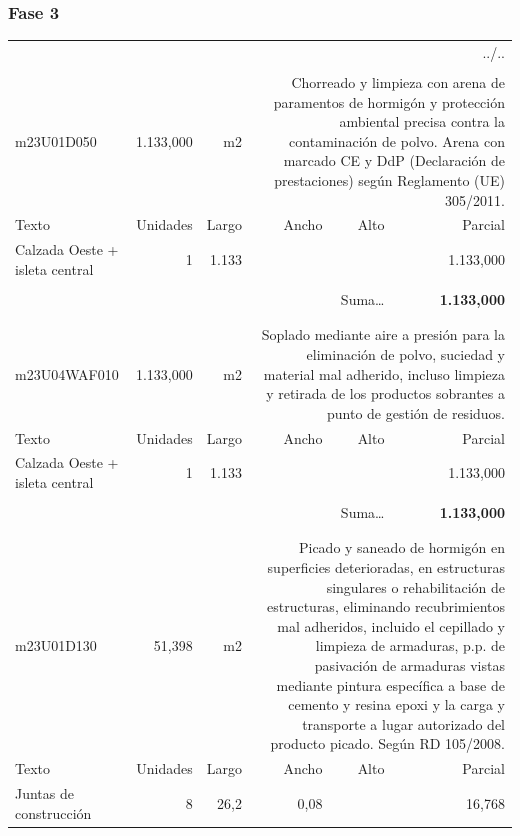 \documentclass{book}%
\begin{document}
\subsubsection{Fase 3}%
\begin{longtable}{lrrrrr}%
\multicolumn{6}{r}{../..}\\%
\endfoot%
\endlastfoot%
&&&&&\\%
m23U01D050& 1.133,000& m2&\multicolumn{3}{p{6cm}}{\scriptsize Chorreado y limpieza con arena de paramentos de hormigón y protección ambiental precisa contra la contaminación de polvo. Arena con marcado CE y DdP (Declaración de prestaciones) según Reglamento (UE) 305/2011.\normalsize}\\%
Texto&Unidades&Largo&Ancho&Alto&Parcial\\%
\hline%
\multicolumn{1}{p{3.5cm}}{Calzada Oeste + isleta central}&1&1.133&&& 1.133,000\\%
&&&&&\\%
\multicolumn{5}{r}{Suma\ldots}&\textbf{ 1.133,000}\\%
\hline%
&&&&&\\%
&&&&&\\%
m23U04WAF010& 1.133,000& m2&\multicolumn{3}{p{6cm}}{\scriptsize Soplado mediante aire a presión para la eliminación de polvo, suciedad y material mal adherido, incluso limpieza y retirada de los productos sobrantes a punto de gestión de residuos.\normalsize}\\%
Texto&Unidades&Largo&Ancho&Alto&Parcial\\%
\hline%
\multicolumn{1}{p{3.5cm}}{Calzada Oeste + isleta central}&1&1.133&&& 1.133,000\\%
&&&&&\\%
\multicolumn{5}{r}{Suma\ldots}&\textbf{ 1.133,000}\\%
\hline%
&&&&&\\%
&&&&&\\%
m23U01D130&    51,398& m2&\multicolumn{3}{p{6cm}}{\scriptsize Picado y saneado de hormigón en superficies deterioradas, en estructuras singulares o rehabilitación de estructuras, eliminando recubrimientos mal adheridos, incluido el cepillado y limpieza de armaduras, p.p. de pasivación de armaduras vistas mediante pintura específica a base de cemento y resina epoxi y la carga y transporte a lugar autorizado del producto picado. Según RD 105/2008.\normalsize}\\%
Texto&Unidades&Largo&Ancho&Alto&Parcial\\%
\hline%
\multicolumn{1}{p{3.5cm}}{Juntas de construcción}&8&26,2&0,08&&    16,768\\%

\end{longtable}
\end{document}
